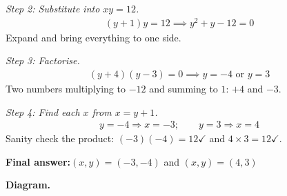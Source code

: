 \documentclass[11pt]{article}
\begin{document}
\textit{Step 2: Substitute into \( xy = 12 \).}
\[\begin{gathered}
(y + 1)y = 12 \implies y^2 + y - 12 = 0
\end{gathered}\]
Expand and bring everything to one side.

\textit{Step 3: Factorise.}
\[\begin{gathered}
(y + 4)(y - 3) = 0 \implies y = -4 \text{ or } y = 3
\end{gathered}\]
Two numbers multiplying to \( -12 \) and summing to \( 1 \): \( +4 \) and \( -3 \).

\textit{Step 4: Find each \( x \) from \( x = y + 1 \).}
\[\begin{gathered}
y = -4 \Rightarrow x = -3; \qquad y = 3 \Rightarrow x = 4
\end{gathered}\]
Sanity check the product: \( (-3)(-4) = 12 \checkmark \) and \( 4 \times 3 = 12 \checkmark \).

\begin{answerbox}
\textbf{Final answer:}\quad \(\displaystyle (x, y) = (-3, -4)\) and \(\displaystyle (x, y) = (4, 3)\)
\end{answerbox}
\textbf{Diagram.}
\end{document}
